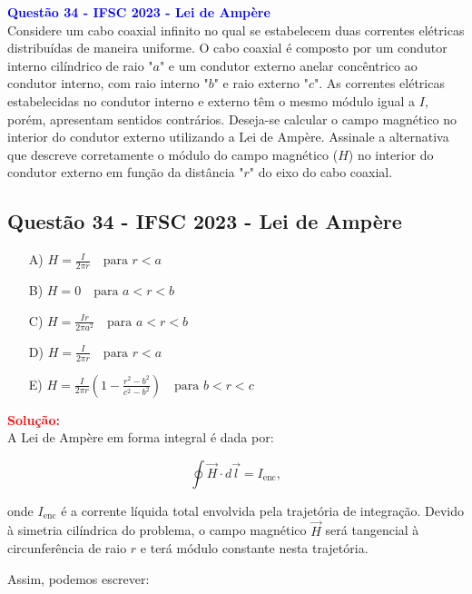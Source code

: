 \begin{flushleft}
\textbf{\textcolor{blue}{\Large Quest\~ao 34 - IFSC 2023 - Lei de Ampère}}\\
\noindent
Considere um cabo coaxial infinito no qual se estabelecem duas correntes elétricas distribuídas de maneira uniforme. 
O cabo coaxial é composto por um condutor interno cilíndrico de raio "$a$" e um condutor externo anelar concêntrico ao 
condutor interno, com raio interno "$b$" e raio externo "$c$". As correntes elétricas estabelecidas no condutor interno 
e externo têm o mesmo módulo igual a $I$, porém, apresentam sentidos contrários. Deseja-se calcular o campo magnético no 
interior do condutor externo utilizando a Lei de Ampère. Assinale a alternativa que descreve corretamente o módulo do campo 
magnético ($H$) no interior do condutor externo em função da distância "$r$" do eixo do cabo coaxial.


\subsection{Quest\~ao 34 - IFSC 2023 - Lei de Ampère }

\begin{itemize}
\item[A)] \( H = \frac{I}{2 \pi r} \quad \text{para } r < a \)
\item[B)] \( H = 0 \quad \text{para } a < r < b \)
\item[C)] \( H = \frac{I r}{2 \pi a^2} \quad \text{para } a < r < b \)
\item[D)] \( H = \frac{I}{2 \pi r} \quad \text{para } r < a \)
\item[E)] \( H = \frac{I}{2 \pi r} \left( 1 - \frac{r^2 - b^2}{c^2 - b^2} \right) \quad \text{para } b < r < c \)
\end{itemize}

\vspace{0.5cm}

\textcolor{red}{\textbf{Solução:}}\\

A Lei de Ampère em forma integral é dada por:

\[
\oint \vec{H} \cdot d\vec{l} = I_{\text{enc}},
\]

onde \(I_{\text{enc}}\) é a corrente líquida total envolvida pela trajetória de integração. Devido à simetria cilíndrica do problema, o campo magnético \(\vec{H}\) será tangencial à circunferência de raio \(r\) e terá módulo constante nesta trajetória.

Assim, podemos escrever:


\end{flushleft}
